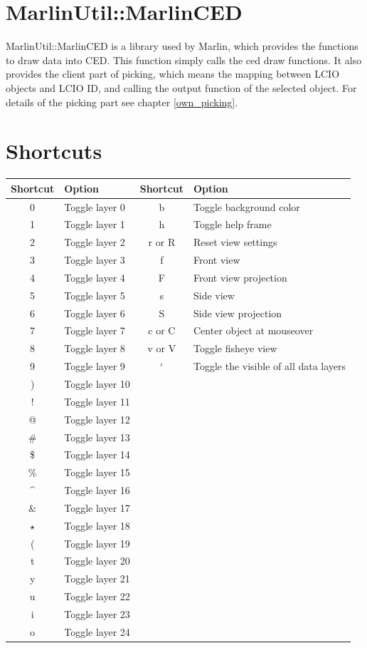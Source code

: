 \documentclass[a4paper,10pt]{article}
\begin{document}

\section{MarlinUtil::MarlinCED}
MarlinUtil::MarlinCED is a library used by Marlin, which provides the functions to draw data into CED. This function simply calls the ced draw functions. It also provides the client part of picking, which means the  mapping between LCIO objects and LCIO ID, and calling the output function of the selected object. For details of the picking part see chapter \ref{own_picking}.

\section{Shortcuts} 
\begin{center}
 \begin{tabular}[ht]{|c|l||c|l|}
  \hline
  Shortcut & Option & Shortcut & Option\\
  \hline\hline
  0 & Toggle layer 0 & b & Toggle background color\\
  1 & Toggle layer 1 & h & Toggle help frame\\
  2 & Toggle layer 2 & r or R & Reset view settings\\
  3 & Toggle layer 3 & f & Front view\\
  4 & Toggle layer 4 & F & Front view projection\\
  5 & Toggle layer 5 & s & Side view\\
  6 & Toggle layer 6 & S & Side view projection\\
  7 & Toggle layer 7 & c or C & Center object at mouseover\\
  8 & Toggle layer 8 & v or V & Toggle fisheye view\\
  9 & Toggle layer 9 & $`$ & Toggle the visible of all data layers\\
  ) & Toggle layer 10 & &\\
  ! & Toggle layer 11 & &\\
  @ & Toggle layer 12 & &\\
  \# & Toggle layer 13 & &\\
  \$ & Toggle layer 14 & &\\
  \% & Toggle layer 15 & &\\
  \textasciicircum  & Toggle layer 16 & &\\
  \& & Toggle layer 17 & &\\
  $\star$ & Toggle layer 18 & &\\
  ( & Toggle layer 19 & &\\
  t & Toggle layer 20 & &\\
  y & Toggle layer 21 & &\\
  u & Toggle layer 22 & &\\
  i & Toggle layer 23 & &\\
  o & Toggle layer 24 & &\\
  \hline
\end{tabular}
\end{center}
\end{document}
